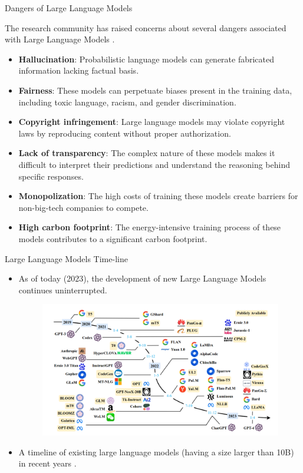\documentclass[handout]{beamer}
\begin{document}
\begin{frame}{Dangers of Large Language Models}
\begin{scriptsize}
The research community has raised concerns about several dangers associated with Large Language Models \cite{bender2021dangers}.
\begin{itemize}
\item \textbf{Hallucination}: Probabilistic language models can generate fabricated information lacking factual basis.
\item \textbf{Fairness}: These models can perpetuate biases present in the training data, including toxic language, racism, and gender discrimination.
\item \textbf{Copyright infringement}: Large language models may violate copyright laws by reproducing content without proper authorization.
\item \textbf{Lack of transparency}: The complex nature of these models makes it difficult to interpret their predictions and understand the reasoning behind specific responses.
\item \textbf{Monopolization}: The high costs of training these models create barriers for non-big-tech companies to compete.
\item \textbf{High carbon footprint}: The energy-intensive training process of these models contributes to a significant carbon footprint.
\end{itemize}
\end{scriptsize}
\end{frame}




\begin{frame}{Large Language Models Time-line}
\begin{scriptsize}
\begin{itemize}
\item As of today (2023), the development of new Large Language Models continues uninterrupted.
 \begin{figure}[h]
        	\includegraphics[scale = 0.33]{pics/llmtimeline.png}
        \end{figure}
\item A timeline of existing large language models (having a size larger than 10B) in recent years \cite{zhao2023survey}.
\end{itemize}
\end{scriptsize}




\end{frame}
\end{document}
